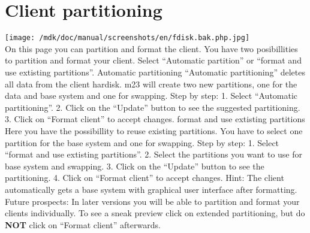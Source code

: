 \section{Client partitioning}
\texttt{[image: /mdk/doc/manual/screenshots/en/fdisk.bak.php.jpg]} \\
 On this page you can partition and format the client. You have two posibillities to partition and format your client. Select ``Automatic partition'' or ``format and use extisting partitions''. Automatic partitioning ``Automatic partitioning'' deletes all data from the client hardisk. m23 will create two new partitions, one for the data and base system and one for swapping. Step by step: 1. Select ``Automatic partitioning''. 2. Click on the ``Update'' button to see the suggested partitioning. 3. Click on ``Format client'' to accept changes. format and use extisting partitions Here you have the possibillity to reuse existing partitions. You have to select one partition for the base system and one for swapping. Step by step: 1. Select ``format and use extisting partitions''. 2. Select the partitions you want to use for base system and swapping. 3. Click on the ``Update'' button to see the partitioning. 4. Click on ``Format client'' to accept changes. Hint: The client automatically gets a base system with graphical user interface after formatting. Future prospects: In later versions you will be able to partition and format your clients individually. To see a sneak preview click on extended partitioning, but do \textbf{NOT}
 click on ``Format client'' afterwards. 

